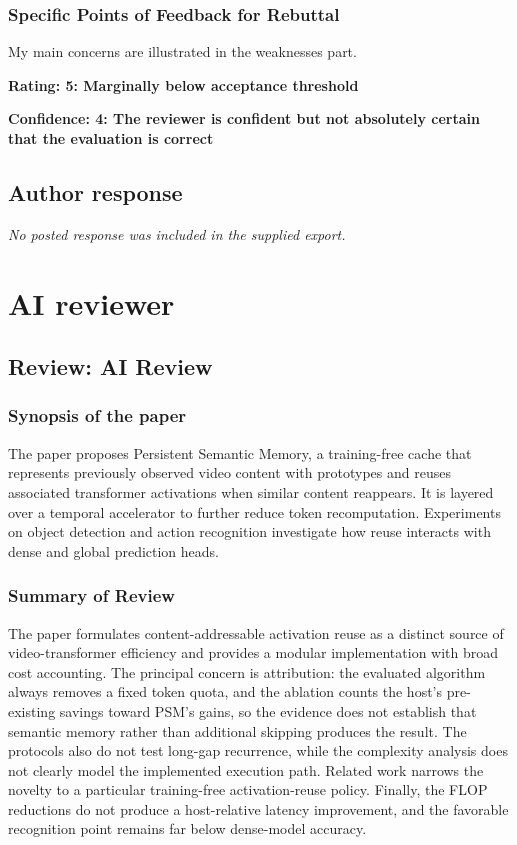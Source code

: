 \documentclass[11pt]{article}
\begin{document}
\subsubsection*{Specific Points of Feedback for Rebuttal}
My main concerns are illustrated in the weaknesses part.

\noindent\textbf{Rating: 5: Marginally below acceptance threshold}\par
\noindent\textbf{Confidence: 4: The reviewer is confident but not absolutely certain that the evaluation is correct}\par

\subsection{Author response}

\emph{No posted response was included in the supplied export.}

\clearpage

\section{AI reviewer}

\subsection*{Review: AI Review}

\subsubsection*{Synopsis of the paper}
The paper proposes Persistent Semantic Memory, a training-free cache that represents previously observed video content with prototypes and reuses associated transformer activations when similar content reappears. It is layered over a temporal accelerator to further reduce token recomputation. Experiments on object detection and action recognition investigate how reuse interacts with dense and global prediction heads.

\subsubsection*{Summary of Review}
The paper formulates content-addressable activation reuse as a distinct source of video-transformer efficiency and provides a modular implementation with broad cost accounting. The principal concern is attribution: the evaluated algorithm always removes a fixed token quota, and the ablation counts the host's pre-existing savings toward PSM's gains, so the evidence does not establish that semantic memory rather than additional skipping produces the result. The protocols also do not test long-gap recurrence, while the complexity analysis does not clearly model the implemented execution path. Related work narrows the novelty to a particular training-free activation-reuse policy. Finally, the FLOP reductions do not produce a host-relative latency improvement, and the favorable recognition point remains far below dense-model accuracy.
\end{document}

